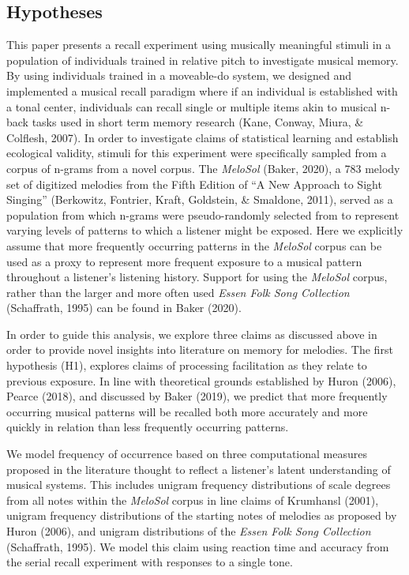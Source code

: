\documentclass[english,man,floatsintext]{apa6}
\begin{document}
\hypertarget{hypotheses}{%
\subsection{Hypotheses}\label{hypotheses}}

This paper presents a recall experiment using musically meaningful stimuli in a population of individuals trained in relative pitch to investigate musical memory.
By using individuals trained in a moveable-do system, we designed and implemented a musical recall paradigm where if an individual is established with a tonal center, individuals can recall single or multiple items akin to musical n-back tasks used in short term memory research (Kane, Conway, Miura, \& Colflesh, 2007).
In order to investigate claims of statistical learning and establish ecological validity, stimuli for this experiment were specifically sampled from a corpus of n-grams from a novel corpus.
The \emph{MeloSol} (Baker, 2020), a 783 melody set of digitized melodies from the Fifth Edition of \enquote{A New Approach to Sight Singing} (Berkowitz, Fontrier, Kraft, Goldstein, \& Smaldone, 2011), served as a population from which n-grams were pseudo-randomly selected from to represent varying levels of patterns to which a listener might be exposed.
Here we explicitly assume that more frequently occurring patterns in the \emph{MeloSol} corpus can be used as a proxy to represent more frequent exposure to a musical pattern throughout a listener's listening history.
Support for using the \emph{MeloSol} corpus, rather than the larger and more often used \emph{Essen Folk Song Collection} (Schaffrath, 1995) can be found in Baker (2020).

In order to guide this analysis, we explore three claims as discussed above in order to provide novel insights into literature on memory for melodies.
The first hypothesis (H1), explores claims of processing facilitation as they relate to previous exposure.
In line with theoretical grounds established by Huron (2006), Pearce (2018), and discussed by Baker (2019), we predict that more frequently occurring musical patterns will be recalled both more accurately and more quickly in relation than less frequently occurring patterns.

We model frequency of occurrence based on three computational measures proposed in the literature thought to reflect a listener's latent understanding of musical systems.
This includes unigram frequency distributions of scale degrees from all notes within the \emph{MeloSol} corpus in line claims of Krumhansl (2001), unigram frequency distributions of the starting notes of melodies as proposed by Huron (2006), and unigram distributions of the \emph{Essen Folk Song Collection} (Schaffrath, 1995).
We model this claim using reaction time and accuracy from the serial recall experiment with responses to a single tone.
\end{document}
